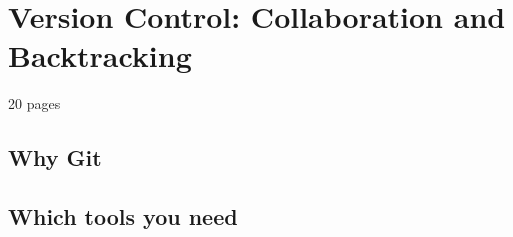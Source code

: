 \chapter{Version Control: Collaboration and Backtracking}
20 pages
\section{Why Git}
\section{Which tools you need}